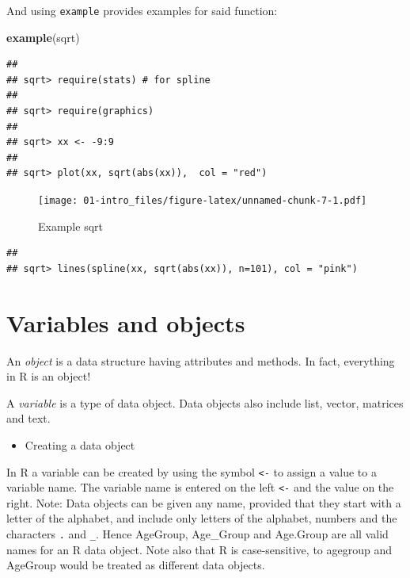 \documentclass[]{book}
\newenvironment{Shaded}{\begin{snugshade}}{\end{snugshade}}
\newcommand{\KeywordTok}[1]{\textcolor[rgb]{0.13,0.29,0.53}{\textbf{#1}}}
\newcommand{\NormalTok}[1]{#1}
\providecommand{\tightlist}{%
  \setlength{\itemsep}{0pt}\setlength{\parskip}{0pt}}
\begin{document}
And using \texttt{example} provides examples for said function:

\begin{Shaded}
\begin{Highlighting}[]
\KeywordTok{example}\NormalTok{(sqrt)}
\end{Highlighting}
\end{Shaded}

\begin{verbatim}
## 
## sqrt> require(stats) # for spline
## 
## sqrt> require(graphics)
## 
## sqrt> xx <- -9:9
## 
## sqrt> plot(xx, sqrt(abs(xx)),  col = "red")
\end{verbatim}

\begin{figure}
\centering
\texttt{[image: 01-intro\_files/figure-latex/unnamed-chunk-7-1.pdf]}
\caption{\label{fig:unnamed-chunk-7}Example sqrt}
\end{figure}

\begin{verbatim}
## 
## sqrt> lines(spline(xx, sqrt(abs(xx)), n=101), col = "pink")
\end{verbatim}

\section{Variables and objects}\label{variables-and-objects}

An \emph{object} is a data structure having attributes and methods. In
fact, everything in R is an object!

A \emph{variable} is a type of data object. Data objects also include
list, vector, matrices and text.

\begin{itemize}
\tightlist
\item
  Creating a data object
\end{itemize}

In R a variable can be created by using the symbol \texttt{\textless{}-}
to assign a value to a variable name. The variable name is entered on
the left \texttt{\textless{}-} and the value on the right. Note: Data
objects can be given any name, provided that they start with a letter of
the alphabet, and include only letters of the alphabet, numbers and the
characters \texttt{.} and \texttt{\_}. Hence AgeGroup, Age\_Group and
Age.Group are all valid names for an R data object. Note also that R is
case-sensitive, to agegroup and AgeGroup would be treated as different
data objects.
\end{document}
